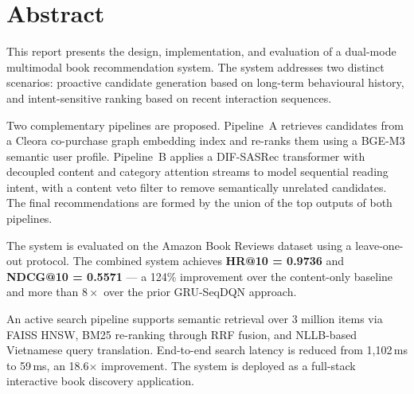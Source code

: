 \chapter*{Abstract}

This report presents the design, implementation, and evaluation of a dual-mode multimodal book recommendation system.
The system addresses two distinct scenarios: proactive candidate generation based on long-term behavioural history, and intent-sensitive ranking based on recent interaction sequences.

Two complementary pipelines are proposed.
Pipeline~A retrieves candidates from a Cleora co-purchase graph embedding index and re-ranks them using a BGE-M3 semantic user profile.
Pipeline~B applies a DIF-SASRec transformer with decoupled content and category attention streams to model sequential reading intent, with a content veto filter to remove semantically unrelated candidates.
The final recommendations are formed by the union of the top outputs of both pipelines.

The system is evaluated on the Amazon Book Reviews dataset using a leave-one-out protocol.
The combined system achieves \textbf{HR@10 = 0.9736} and \textbf{NDCG@10 = 0.5571} — a 124\% improvement over the content-only baseline and more than $8\times$ over the prior GRU-SeqDQN approach.

An active search pipeline supports semantic retrieval over 3 million items via FAISS HNSW, BM25 re-ranking through RRF fusion, and NLLB-based Vietnamese query translation.
End-to-end search latency is reduced from 1{,}102\,ms to 59\,ms, an 18.6$\times$ improvement.
The system is deployed as a full-stack interactive book discovery application.


